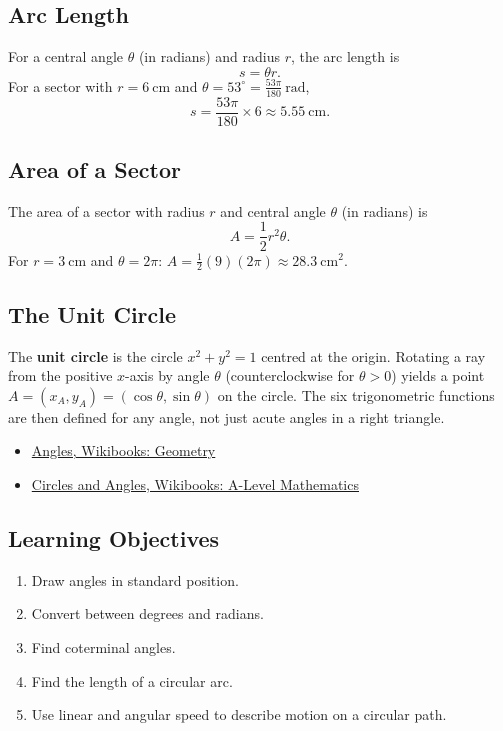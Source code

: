 \subsection*{Arc Length}

For a central angle $\theta$ (in radians) and radius $r$, the arc length is
\[
  s = \theta r.
\]
For a sector with $r = 6\ \text{cm}$ and $\theta = 53^{\circ} =
\frac{53\pi}{180}\ \text{rad}$,
\[
  s = \frac{53\pi}{180} \times 6 \approx 5.55\ \text{cm}.
\]

\subsection*{Area of a Sector}

The area of a sector with radius $r$ and central angle $\theta$ (in radians)
is
\[
  A = \frac{1}{2}r^{2}\theta.
\]
For $r = 3\ \text{cm}$ and $\theta = 2\pi$:
$A = \frac{1}{2}(9)(2\pi) \approx 28.3\ \text{cm}^{2}$.

\subsection*{The Unit Circle}

The \textbf{unit circle} is the circle $x^{2} + y^{2} = 1$ centred at the
origin.  Rotating a ray from the positive $x$-axis by angle $\theta$
(counterclockwise for $\theta > 0$) yields a point
$A = (x_{A}, y_{A}) = (\cos\theta, \sin\theta)$ on the circle.  The six
trigonometric functions are then defined for any angle, not just acute angles
in a right triangle.

\begin{itemize}
  \item \href{https://en.wikibooks.org/wiki/Geometry/Angles}{Angles, Wikibooks: Geometry}
  \item \href{https://en.wikibooks.org/wiki/A-level_Mathematics/OCR/C2/Circles_and_Angles}{Circles and Angles, Wikibooks: A-Level Mathematics}
\end{itemize}

\subsection{Learning Objectives}
\label{ssec:lear-fe6e}

\begin{enumerate}
    \item Draw angles in standard position.
    \item Convert between degrees and radians.
    \item Find coterminal angles.
    \item Find the length of a circular arc.
    \item Use linear and angular speed to describe motion on a circular path.
\end{enumerate}

